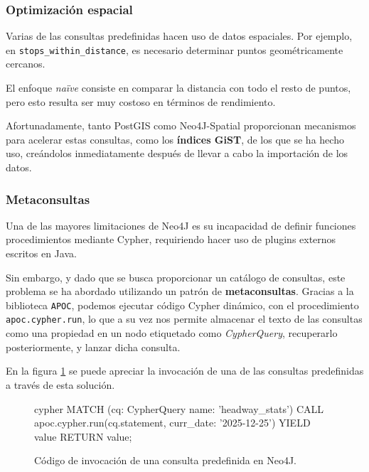 \subsubsection{Optimización espacial}

Varias de las consultas predefinidas hacen uso de datos espaciales. Por ejemplo, en \texttt{stops\_within\_distance}, es necesario determinar puntos geométricamente cercanos.

El enfoque \textit{naïve} consiste en comparar la distancia con todo el resto de puntos, pero esto resulta ser muy costoso en términos de rendimiento.

Afortunadamente, tanto PostGIS\cite{postgis} como Neo4J-Spatial\cite{neo4j-spatial} proporcionan mecanismos para acelerar estas consultas, como los \textbf{índices GiST}, de los que se ha hecho uso, creándolos inmediatamente después de llevar a cabo la importación de los datos.

\subsubsection{Metaconsultas}

Una de las mayores limitaciones de Neo4J es su incapacidad de definir funciones procedimientos mediante Cypher, requiriendo hacer uso de plugins externos escritos en Java.

Sin embargo, y dado que se busca proporcionar un catálogo de consultas, este problema se ha abordado utilizando un patrón de \textbf{metaconsultas}. Gracias a la biblioteca \texttt{APOC}, podemos ejecutar código Cypher dinámico, con el procedimiento \texttt{apoc.cypher.run}, lo que a su vez nos permite almacenar el texto de las consultas como una propiedad en un nodo etiquetado como \textit{CypherQuery}, recuperarlo posteriormente, y lanzar dicha consulta.

En la figura \ref{design:metaqueries} se puede apreciar la invocación de una de las consultas predefinidas a través de esta solución.

\begin{figure}[h]
    \centering
    \vspace{0.2cm}
    \begin{huggedminted}{cypher}
MATCH (cq: CypherQuery {name: 'headway_stats'})
CALL apoc.cypher.run(cq.statement, {curr_date: '2025-12-25'})
YIELD value
RETURN value;
    \end{huggedminted}
    \caption{Código de invocación de una consulta predefinida en Neo4J.}
    \label{design:metaqueries}
\end{figure}

